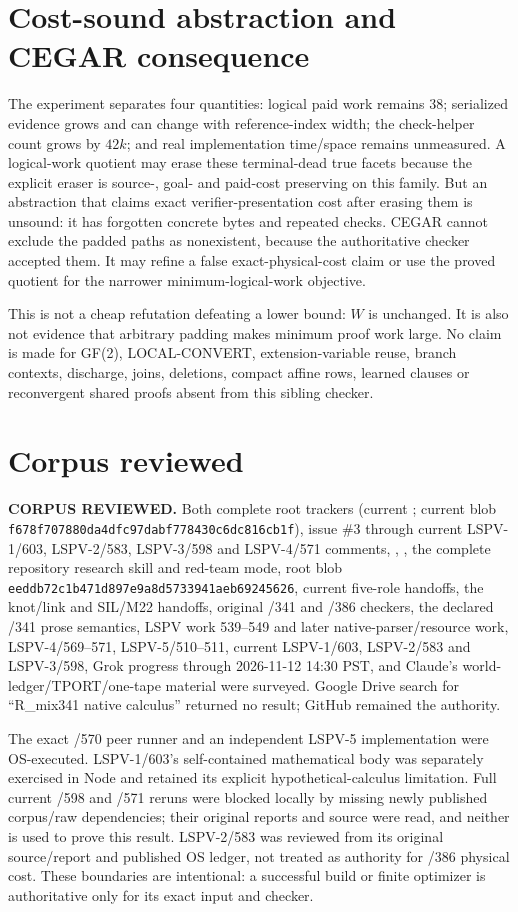 \documentclass[11pt]{article}
\begin{document}
\section*{Cost-sound abstraction and CEGAR consequence}
The experiment separates four quantities: logical paid work remains 38; serialized evidence grows and can change with reference-index width; the check-helper count grows by $42k$; and real implementation time/space remains unmeasured.  A logical-work quotient may erase these terminal-dead true facets because the explicit eraser is source-, goal- and paid-cost preserving on this family.  But an abstraction that claims exact verifier-presentation cost after erasing them is unsound: it has forgotten concrete bytes and repeated checks.  CEGAR cannot exclude the padded paths as nonexistent, because the authoritative checker accepted them.  It may refine a false exact-physical-cost claim or use the proved quotient for the narrower minimum-logical-work objective.

This is not a cheap refutation defeating a lower bound: $W$ is unchanged.  It is also not evidence that arbitrary padding makes minimum proof work large.  No claim is made for GF(2), LOCAL-CONVERT, extension-variable reuse, branch contexts, discharge, joins, deletions, compact affine rows, learned clauses or reconvergent shared proofs absent from this sibling checker.

\section*{Corpus reviewed}
\textbf{CORPUS REVIEWED.} Both complete root trackers (current ; current  blob \texttt{f678f707880da4dfc97dabf778430c6dc816cb1f}), issue \#3 through current LSPV-1/603, LSPV-2/583, LSPV-3/598 and LSPV-4/571 comments, , , the complete repository research skill and red-team mode, root  blob \texttt{eeddb72c1b471d897e9a8d5733941aeb69245626}, current five-role handoffs, the knot/link and SIL/M22 handoffs, original /341 and /386 checkers, the declared /341 prose semantics, LSPV work 539--549 and later native-parser/resource work, LSPV-4/569--571, LSPV-5/510--511, current LSPV-1/603, LSPV-2/583 and LSPV-3/598, Grok progress through 2026-11-12 14:30 PST, and Claude's world-ledger/TPORT/one-tape material were surveyed.  Google Drive search for ``R\_mix341 native calculus'' returned no result; GitHub remained the authority.

The exact /570 peer runner and an independent LSPV-5 implementation were OS-executed.  LSPV-1/603's self-contained mathematical body was separately exercised in Node and retained its explicit hypothetical-calculus limitation.  Full current /598 and /571 reruns were blocked locally by missing newly published corpus/raw dependencies; their original reports and source were read, and neither is used to prove this result.  LSPV-2/583 was reviewed from its original source/report and published OS ledger, not treated as authority for /386 physical cost.  These boundaries are intentional: a successful build or finite optimizer is authoritative only for its exact input and checker.
\end{document}
